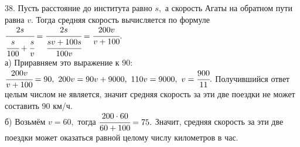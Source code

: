 38. Пусть расстояние до института равно $s,$ а скорость Агаты на обратном пути равна $v.$ Тогда средняя скорость вычисляется по формуле $\cfrac{2s}{\cfrac{s}{100}+\cfrac{s}{v}}=\cfrac{2s}{\cfrac{sv+100s}{100v}}=\cfrac{200v}{v+100}.$\\
а) Приравняем это выражение к 90: $\cfrac{200v}{v+100}=90,\ 200v=90v+9000,\ 110v=9000,\ v=\cfrac{900}{11}.$ Получившийся ответ целым числом не является, значит средняя скорость за эти две поездки не может составить 90 км/ч.\\
б) Возьмём $v=60,$ тогда $\cfrac{200\cdot60}{60+100}=75.$ Значит, средняя скорость за эти две поездки может оказаться равной целому числу километров в час.\\
